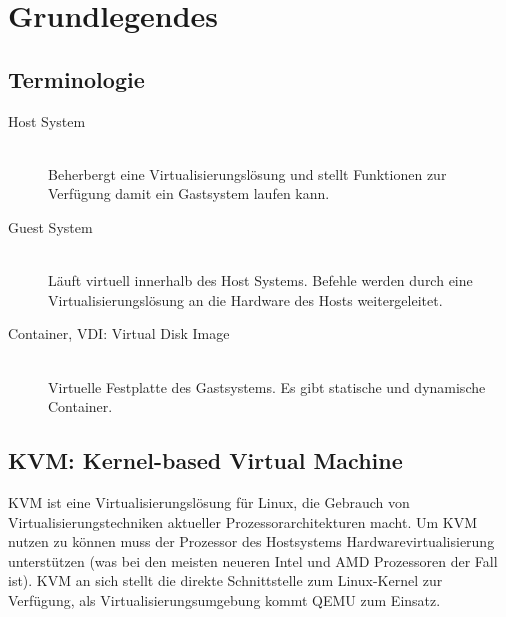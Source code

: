 

\newcommand{\SUBJECT}{Report}
\newcommand{\TITLE}{Cloud Infrastructre Lab 4}











\section{Grundlegendes}
\subsection{Terminologie}
\begin{description}
	\item[Host System] \hfill \\
	Beherbergt eine Virtualisierungslösung und stellt Funktionen zur Verfügung damit ein Gastsystem laufen kann.
	\item[Guest System] \hfill \\
	Läuft virtuell innerhalb des Host Systems. Befehle werden durch eine Virtualisierungslösung an die Hardware des Hosts weitergeleitet. 
	\item[Container, VDI: Virtual Disk Image] \hfill \\
	 Virtuelle Festplatte des Gastsystems. Es gibt statische und dynamische Container.
\end{description}

\subsection{KVM: Kernel-based Virtual Machine}
KVM ist eine Virtualisierungslösung für Linux, die Gebrauch von Virtualisierungstechniken aktueller Prozessorarchitekturen macht. Um KVM nutzen zu können muss der Prozessor des Hostsystems Hardwarevirtualisierung unterstützen (was bei den meisten neueren Intel und AMD Prozessoren der Fall ist). KVM an sich stellt die direkte Schnittstelle zum Linux-Kernel zur Verfügung, als Virtualisierungsumgebung kommt QEMU zum Einsatz.

